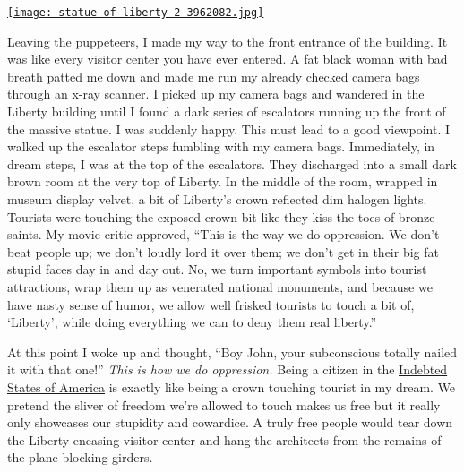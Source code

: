 \captionsetup[floatingfigure]{labelformat=empty}
\begin{floatingfigure}[r]{0.27\textwidth}
\centering
\href{http://conceptcontrol.smugmug.com/Trips/USA-and-Canada/New-York-2005-1/7461666\_BQ3QDf\#!i=481352959\&k=thrPPpx\&lb=1\&s=A}{\texttt{[image: statue-of-liberty-2-3962082.jpg]}}
\label{fig:3720X0}
\end{floatingfigure} Leaving the puppeteers, I made my way to the front entrance of the
building. It was like every visitor center you have ever entered. A fat
black woman with bad breath patted me down and made me run my already
checked camera bags through an x-ray scanner. I picked up my camera bags
and wandered in the Liberty building until I found a dark series of
escalators running up the front of the massive statue. I was suddenly
happy. This must lead to a good viewpoint. I walked up the escalator
steps fumbling with my camera bags. Immediately, in dream steps, I was
at the top of the escalators. They discharged into a small dark brown
room at the very top of Liberty. In the middle of the room, wrapped in
museum display velvet, a bit of Liberty's crown reflected dim halogen
lights. Tourists were touching the exposed crown bit like they kiss the
toes of bronze saints. My movie critic approved, ``This is the way we do
oppression. We don't beat people up; we don't loudly lord it over them;
we don't get in their big fat stupid faces day in and day out. No, we
turn important symbols into tourist attractions, wrap them up as
venerated national monuments, and because we have nasty sense of humor,
we allow well frisked tourists to touch a bit of, `Liberty', while doing
everything we can to deny them real liberty.''

At this point I woke up and thought, ``Boy John, your subconscious
totally nailed it with that one!'' \emph{This is how we do oppression.}
Being a citizen in the \href{http://www.usdebtclock.org/}{Indebted
States of America} is exactly like being a crown touching tourist in my
dream. We pretend the sliver of freedom we're allowed to touch makes us
free but it really only showcases our stupidity and cowardice. A truly
free people would tear down the Liberty encasing visitor center and hang
the architects from the remains of the plane blocking girders.



%